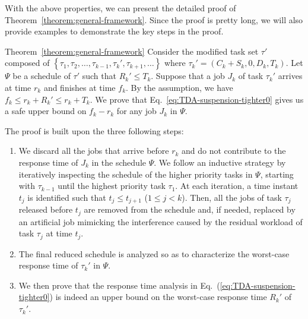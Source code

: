 With the above properties, we can present the detailed proof of
Theorem~\ref{theorem:general-framework}. Since the proof is pretty long, we 
will also provide examples to demonstrate the key steps in the proof.

\begin{appProof}{Theorem~\ref{theorem:general-framework}}
Consider the modified task set $\tau'$ composed of $\left\{\tau_1, \tau_2, \ldots, \tau_{k-1}, \tau_k', \tau_{k+1}, \ldots \right\}$ where $\tau_k' = (C_k + S_k, 0, D_k, T_k)$. Let $\Psi$ be a schedule of $\tau'$ such that $R_k' \leq T_k$.  
Suppose that a job $J_{k}$ of task $\tau_k'$ arrives at time $r_k$ and finishes at time $f_k$. 
By the assumption, we have $f_k \leq r_k+R_k' \leq r_k+T_k$.
We prove that Eq.~\eqref{eq:TDA-suspension-tighter0} gives us a safe upper bound on $f_k-r_k$ for any job $J_k$ in $\Psi$.


The proof is built upon the three following steps:
\begin{enumerate}
\item We discard all the jobs that arrive before $r_k$ and do not contribute to the response time of $J_k$ in the schedule $\Psi$. We follow an inductive strategy by iteratively inspecting the schedule of the higher priority tasks in $\Psi$, starting with $\tau_{k-1}$ until the highest priority task $\tau_1$. At each iteration, a time instant $t_j$ is identified such that $t_j \leq t_{j+1}$ ($1 \leq j < k$). Then, all the jobs of task $\tau_j$ released before $t_j$ are removed from the schedule and, if needed, replaced by an artificial job mimicking the interference caused by the residual workload of task $\tau_j$ at time $t_j$. %
\item The final reduced schedule is analyzed so as to characterize the
  worst-case response time of $\tau_k'$ in $\Psi$. %
\item We then prove that the response time analysis in Eq.~(\ref{eq:TDA-suspension-tighter0}) is indeed an upper bound on the worst-case response time $R_k'$ of $\tau_k'$.
\end{enumerate}

  

\end{appProof}
